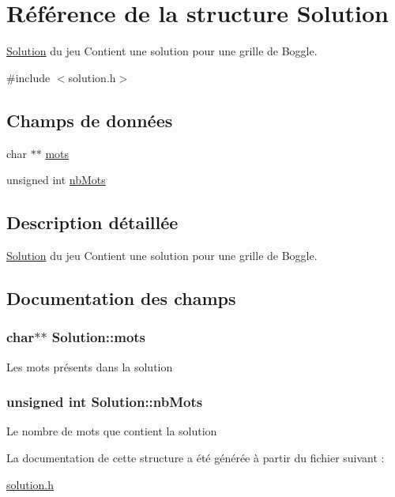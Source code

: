 \hypertarget{structSolution}{\section{Référence de la structure Solution}
\label{structSolution}
}


\hyperlink{structSolution}{Solution} du jeu Contient une solution pour une grille de Boggle.  




{\ttfamily \#include $<$solution.\-h$>$}

\subsection*{Champs de données}
\begin{DoxyCompactItemize}
\item 
char $\ast$$\ast$ \hyperlink{structSolution_ab511245410043c846351c6acf272d656}{mots}
\item 
unsigned int \hyperlink{structSolution_a60e0881a49e593091d2210dd49f2f51a}{nb\-Mots}
\end{DoxyCompactItemize}


\subsection{Description détaillée}
\hyperlink{structSolution}{Solution} du jeu Contient une solution pour une grille de Boggle. 

\subsection{Documentation des champs}
\hypertarget{structSolution_ab511245410043c846351c6acf272d656}{
\subsubsection[{mots}]{\setlength{\rightskip}{0pt plus 5cm}char$\ast$$\ast$ Solution\-::mots}}\label{structSolution_ab511245410043c846351c6acf272d656}
Les mots présents dans la solution \hypertarget{structSolution_a60e0881a49e593091d2210dd49f2f51a}{
\subsubsection[{nb\-Mots}]{\setlength{\rightskip}{0pt plus 5cm}unsigned int Solution\-::nb\-Mots}}\label{structSolution_a60e0881a49e593091d2210dd49f2f51a}
Le nombre de mots que contient la solution 

La documentation de cette structure a été générée à partir du fichier suivant \-:\begin{DoxyCompactItemize}
\item 
\hyperlink{solution_8h}{solution.\-h}\end{DoxyCompactItemize}
